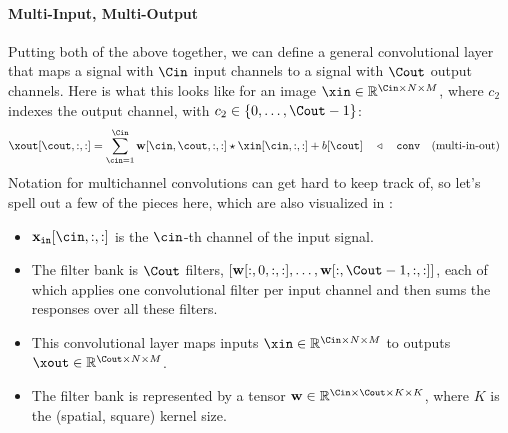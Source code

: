 \paragraph*{Multi-Input, Multi-Output} Putting both of the above together, we can define a general convolutional layer that maps a signal with $\Cin$ input channels to a signal with $\Cout$ output channels. Here is what this looks like for an image $\xin \in \mathbb{R}^{\Cin \times N \times M}$, where $c_2$ indexes the output channel, with $c_2 \in \{0, \ldots, \Cout-1\}$:
\begin{align}
    \xout[\cout,:,:] = \sum_{\cin=1}^{\Cin} \mathbf{w}[\cin,\cout,:,:] \star \xin[\cin,:,:] + b[\cout] & \quad \triangleleft \quad\texttt{conv}\quad \text{(multi-in-out)}
    \label{eqn:convolutional_neural_nets:convolutional_layer_multichannel}
\end{align}
Notation for multichannel convolutions can get hard to keep track of, so let's spell out a few of the pieces here, which are also visualized in \fig{\ref{fig:convolutional_neural_networks:multichannel_conv}}:
\begin{itemize}
    \item $\mathbf{x}_{\texttt{in}}[\cin,:,:]$ is the $\cin$-th channel of the input signal.
    \item The filter bank is $\Cout$ filters, $[\mathbf{w}[:,0,:,:], \ldots, \mathbf{w}[:,\Cout-1,:,:]]$, each of which applies one convolutional filter per input channel and then sums the responses over all these filters.
    \item This convolutional layer maps inputs $\xin \in \mathbb{R}^{\Cin \times N \times M}$ to outputs $\xout \in \mathbb{R}^{\Cout \times N \times M}$.
    \item  The filter bank is represented by a tensor $\mathbf{w} \in \mathbb{R}^{\Cin \times \Cout \times K \times K}$, where $K$ is the (spatial, square) kernel size.
\end{itemize}


